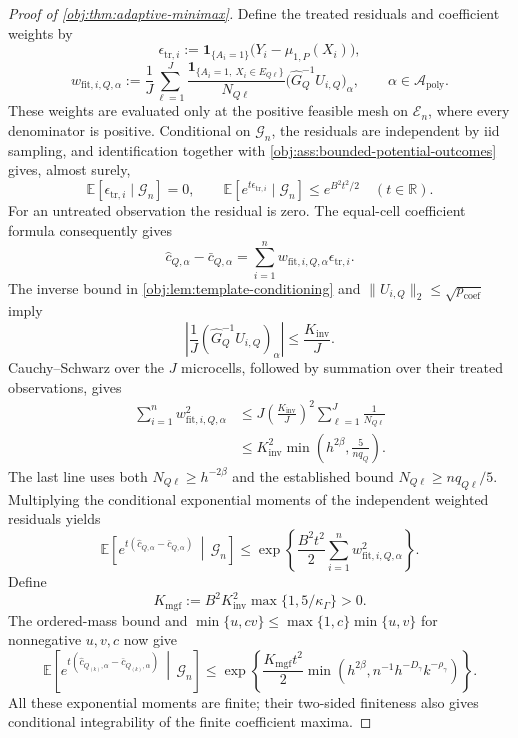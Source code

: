 \documentclass[11pt]{article}
\begin{document}
\begin{proof}[Proof of \cref{obj:thm:adaptive-minimax}]
Define the treated residuals and coefficient weights by
\[
\epsilon_{\mathrm{tr},i}
:=\mathbf1_{\{A_i=1\}}\bigl(Y_i-\mu_{1,P}(X_i)\bigr),
\]
\[
w_{\mathrm{fit},i,Q,\alpha}
:=\frac1J\sum_{\ell=1}^J
\frac{\mathbf1_{\{A_i=1,\ X_i\in E_{Q\ell}\}}}{N_{Q\ell}}
\bigl(\widehat G_Q^{-1}U_{i,Q}\bigr)_\alpha,
\qquad \alpha\in\mathcal A_{\mathrm{poly}}.
\]
These weights are evaluated only at the positive feasible mesh on \(\mathcal E_n\), where every denominator is positive. Conditional on \(\mathcal G_n\), the residuals are independent by iid sampling, and identification together with \cref{obj:ass:bounded-potential-outcomes} gives, almost surely,
\[
\mathbb E[\epsilon_{\mathrm{tr},i}\mid\mathcal G_n]=0,
\qquad
\mathbb E[e^{t\epsilon_{\mathrm{tr},i}}\mid\mathcal G_n]
\le e^{B^2t^2/2}
\quad(t\in\mathbb R).
\]
For an untreated observation the residual is zero. The equal-cell coefficient formula consequently gives
\[
\widehat c_{Q,\alpha}-\bar c_{Q,\alpha}
=\sum_{i=1}^n w_{\mathrm{fit},i,Q,\alpha}
\epsilon_{\mathrm{tr},i}.
\]
The inverse bound in \cref{obj:lem:template-conditioning} and \(\|U_{i,Q}\|_2\le\sqrt{p_{\mathrm{coef}}}\) imply
\[
\left|\frac1J
(\widehat G_Q^{-1}U_{i,Q})_\alpha\right|
\le\frac{K_{\mathrm{inv}}}{J}.
\]
Cauchy--Schwarz over the \(J\) microcells, followed by summation over their treated observations, gives
\[
\begin{aligned}
\sum_{i=1}^n w_{\mathrm{fit},i,Q,\alpha}^2
&\le J\left(\frac{K_{\mathrm{inv}}}{J}\right)^2
\sum_{\ell=1}^J\frac1{N_{Q\ell}}\\
&\le K_{\mathrm{inv}}^2
\min\left(h^{2\beta},\frac5{nq_Q}\right).
\end{aligned}
\]
The last line uses both \(N_{Q\ell}\ge h^{-2\beta}\) and the established bound \(N_{Q\ell}\ge nq_{Q\ell}/5\). Multiplying the conditional exponential moments of the independent weighted residuals yields
\[
\mathbb E\!\left[
 e^{t(\widehat c_{Q,\alpha}-\bar c_{Q,\alpha})}
 \,\middle|\,\mathcal G_n\right]
\le\exp\!\left\{
\frac{B^2t^2}{2}\sum_{i=1}^n
w_{\mathrm{fit},i,Q,\alpha}^2\right\}.
\]
Define
\[
K_{\mathrm{mgf}}
:=B^2K_{\mathrm{inv}}^2\max\{1,5/\kappa_\Gamma\}>0.
\]
The ordered-mass bound and
\(\min\{u,cv\}\le\max\{1,c\}\min\{u,v\}\) for nonnegative \(u,v,c\) now give
\[
\mathbb E\!\left[
 e^{t(\widehat c_{Q_{(k)},\alpha}-\bar c_{Q_{(k)},\alpha})}
 \,\middle|\,\mathcal G_n\right]
\le\exp\!\left\{
\frac{K_{\mathrm{mgf}}t^2}{2}
\min\left(h^{2\beta},n^{-1}h^{-D_\gamma}k^{-\rho_\gamma}\right)
\right\}.
\]
All these exponential moments are finite; their two-sided finiteness also gives conditional integrability of the finite coefficient maxima.


\end{proof}
\end{document}
